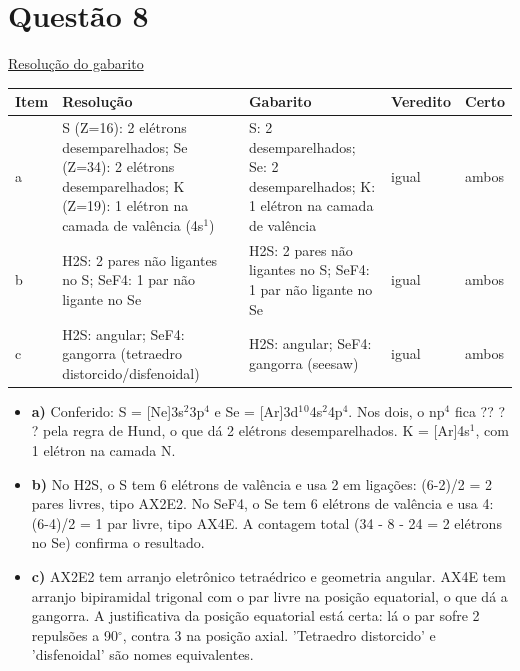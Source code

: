 \documentclass{article}%
\begin{document}
\section*{Questão 8}%
\href{https://poliedroresolve.sistemapoliedro.com.br/vestibulares/ita/2027/ita-2-fase-dia-2-21-10-2026-2-fase-dia-2/dissertativa-8-quimica-2-fase-dia-2-ita-2027}{Resolução do gabarito}\par\smallskip%
\begin{longtable}{@{}p{} p{} p{} p{} p{}@{}}\toprule Item & Resolução & Gabarito & Veredito & Certo \\ \midrule
a & S (Z=16): 2 elétrons desemparelhados; Se (Z=34): 2 elétrons desemparelhados; K (Z=19): 1 elétron na camada de valência (4s$^{1}$) & S: 2 desemparelhados; Se: 2 desemparelhados; K: 1 elétron na camada de valência & igual & ambos \\
b & H2S: 2 pares não ligantes no S; SeF4: 1 par não ligante no Se & H2S: 2 pares não ligantes no S; SeF4: 1 par não ligante no Se & igual & ambos \\
c & H2S: angular; SeF4: gangorra (tetraedro distorcido/disfenoidal) & H2S: angular; SeF4: gangorra (seesaw) & igual & ambos \\
\bottomrule\end{longtable}%
\begin{itemize}%
\item%
\textbf{a)} Conferido: S = {[}Ne{]}3s$^2$3p$^{4}$ e Se = {[}Ar{]}3d$^{1}$$^{0}$4s$^2$4p$^{4}$. Nos dois, o np$^{4}$ fica ?? ? ? pela regra de Hund, o que dá 2 elétrons desemparelhados. K = {[}Ar{]}4s$^{1}$, com 1 elétron na camada N.%
\item%
\textbf{b)} No H2S, o S tem 6 elétrons de valência e usa 2 em ligações: (6-2)/2 = 2 pares livres, tipo AX2E2. No SeF4, o Se tem 6 elétrons de valência e usa 4: (6-4)/2 = 1 par livre, tipo AX4E. A contagem total (34 - 8 - 24 = 2 elétrons no Se) confirma o resultado.%
\item%
\textbf{c)} AX2E2 tem arranjo eletrônico tetraédrico e geometria angular. AX4E tem arranjo bipiramidal trigonal com o par livre na posição equatorial, o que dá a gangorra. A justificativa da posição equatorial está certa: lá o par sofre 2 repulsões a 90$^\circ$, contra 3 na posição axial. 'Tetraedro distorcido' e 'disfenoidal' são nomes equivalentes.%
\end{itemize}%
\end{document}
